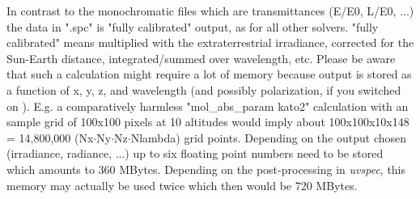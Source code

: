 In contrast to the monochromatic files which are transmittances (E/E0, L/E0,
...) the data in ".spc" is "fully calibrated" output, as for all other
solvers. "fully calibrated" means multiplied with the extraterrestrial 
irradiance, corrected for the Sun-Earth distance, integrated/summed
over wavelength, etc. Please be aware that such a calculation might require
a lot of memory because output is stored as a function of x, y, z, and
wavelength (and possibly polarization, if you switched on ).
E.g. a comparatively harmless "mol\_abs\_param kato2" calculation with an sample grid of 100x100 pixels
at 10 altitudes would imply about 100x100x10x148 = 14,800,000 (Nx$\cdot$Ny$\cdot$Nz$\cdot$Nlambda) grid points. Depending 
on the output chosen (irradiance, radiance, ...) up to six floating 
point numbers need to be stored which amounts to 360 MBytes. Depending 
on the post-processing in {\sl uvspec}, this memory may actually be used 
twice which then would be 720 MBytes. 

